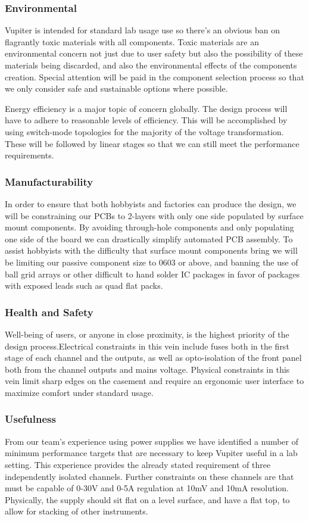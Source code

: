\documentclass[12pt]{article}
\begin{document}
\subsubsection{Environmental}
Vupiter is intended for standard lab usage use so there’s an obvious ban on flagrantly toxic materials 
with all components. Toxic materials are an environmental concern not just due to user safety but also the possibility of these materials being discarded, and also the environmental effects of the components creation. Special attention will be paid in the component selection process so that we only consider safe and sustainable options where possible.

Energy efficiency is a major topic of concern globally. The design process will have to adhere to reasonable levels of efficiency. This will be accomplished by using switch-mode topologies for the majority of the voltage transformation. These will be followed by linear stages so that we can still meet the performance requirements.

\subsubsection{Manufacturability}
In order to ensure that both hobbyists and factories can produce the design, we will be constraining our PCBs to 2-layers with only one side populated by surface mount components. By avoiding through-hole components and only populating one side of the board we can drastically simplify automated PCB assembly. To assist hobbyists with the difficulty that surface mount components bring we will be limiting our passive component size to 0603 or above, and banning the use of ball grid arrays or other difficult to hand solder IC packages in favor of packages with exposed leads such as quad flat packs.

\subsubsection{Health and Safety}
Well-being of users, or anyone in close proximity, is the highest priority of the design process.Electrical constraints in this vein include fuses both in the first stage of each channel and the outputs, as well as opto-isolation of the front panel both from the channel outputs and mains voltage. Physical constraints in this vein limit sharp edges on the casement and require an ergonomic user interface to maximize comfort under standard usage.

\subsubsection{Usefulness}
From our team’s experience using power supplies we have identified a number of minimum performance targets that are necessary to keep Vupiter useful in a lab setting. This experience provides the already stated requirement of three independently isolated channels. Further constraints on these channels are that must be capable of 0-30V and 0-5A regulation at 10mV and 10mA resolution. Physically, the supply should sit flat on a level surface, and have a flat top, to allow for stacking of other instruments.
\end{document}
